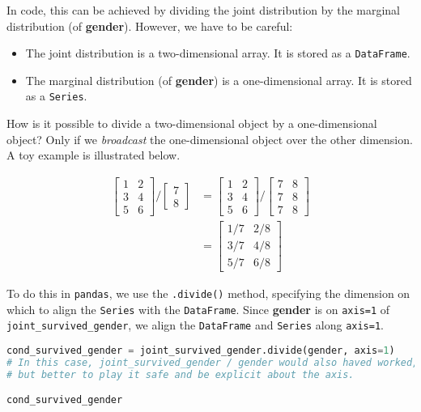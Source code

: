 In code, this can be achieved by dividing the joint distribution by the marginal distribution (of \textbf{gender}). However, we have to be careful:
\begin{itemize}
\item 
The joint distribution is a two-dimensional array. It is stored as a \verb|DataFrame|.

\item 
The marginal distribution (of \textbf{gender}) is a one-dimensional array. It is stored as a \verb|Series|.

\end{itemize}

How is it possible to divide a two-dimensional object by a one-dimensional object? Only if we \textit{broadcast} the one-dimensional object over the other dimension. A toy example is illustrated below.

\begin{align}
\begin{bmatrix} 1 & 2 \\ 3 & 4 \\ 5 & 6 \end{bmatrix} \Big/ \begin{bmatrix} 7 \\ 8 \end{bmatrix} &= \begin{bmatrix} 1 & 2 \\ 3 & 4 \\ 5 & 6 \end{bmatrix}  \Big/ \begin{bmatrix} 7 & 8 \\ 7 & 8 \\ 7 & 8 \end{bmatrix} \\
&= \begin{bmatrix} 1/7 & 2/8 \\ 3/7 & 4/8 \\ 5/7 & 6/8 \end{bmatrix}\end{align}

To do this in \verb|pandas|, we use the \verb|.divide()| method, specifying the dimension on which to align the \verb|Series| with the \verb|DataFrame|. Since \textbf{gender} is on \verb|axis=1| of \verb|joint_survived_gender|, we align the \verb|DataFrame| and \verb|Series| along \verb|axis=1|.

\begin{lstlisting}[language=Python]
cond_survived_gender = joint_survived_gender.divide(gender, axis=1)
# In this case, joint_survived_gender / gender would also haved worked,
# but better to play it safe and be explicit about the axis.

cond_survived_gender 
\end{lstlisting}




